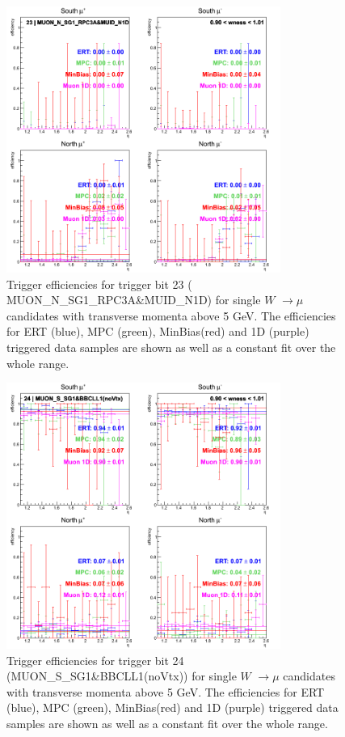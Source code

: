 \clearpage
\begin{figure}[h!]

  \centering

  \includegraphics[width=0.8\textwidth]{./figures/run13_trigeffieta_w1_trig23_lin.png}
  \caption{\label{fig:run13_trigeffieta_w0_nper0_trig23_lin} Trigger efficiencies for trigger bit 23 ( MUON\_N\_SG1\_RPC3A\&MUID\_N1D) for single $W$ $\rightarrow \mu$ candidates with transverse momenta above 5 GeV. The efficiencies for ERT (blue), MPC (green), MinBias(red) and 1D (purple) triggered data samples are shown as well as a constant fit over the whole range.}

\end{figure}
\clearpage
\begin{figure}[h!]

  \centering

  \includegraphics[width=0.8\textwidth]{./figures/run13_trigeffieta_w1_trig24_lin.png}
  \caption{\label{fig:run13_trigeffieta_w0_nper0_trig24_lin} Trigger efficiencies for trigger bit 24 (MUON\_S\_SG1\&BBCLL1(noVtx)) for single $W$ $\rightarrow \mu$ candidates with transverse momenta above 5 GeV. The efficiencies for ERT (blue), MPC (green), MinBias(red) and 1D (purple) triggered data samples are shown as well as a constant fit over the whole range.}

\end{figure}
